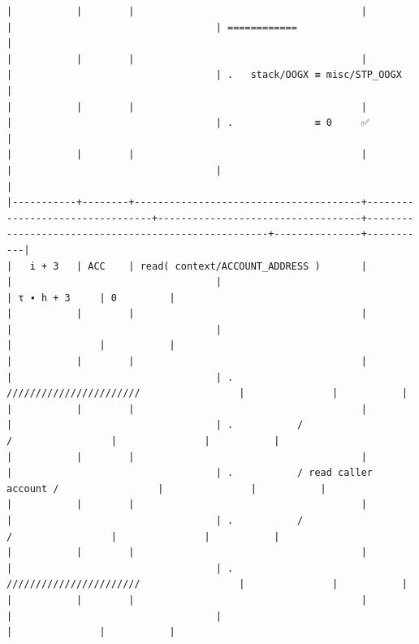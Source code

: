 \documentclass[varwidth=\maxdimen,margin=0.5cm,multi={verbatim}]{standalone}
\begin{document}
\begin{verbatim}
|           |        |                                       |                                 |                                   | ============                                        |
|           |        |                                       |                                 |                                   | .   stack/OOGX ≡ misc/STP_OOGX                      |
|           |        |                                       |                                 |                                   | .              ≡ 0     ✅                           |
|           |        |                                       |                                 |                                   |                                                     |
|-----------+--------+---------------------------------------+---------------------------------+-----------------------------------+-----------------------------------------------------+---------------+-----------|
|   i + 3   | ACC    | read( context/ACCOUNT_ADDRESS )       |                                 |                                   |                                                     | τ ∙ h + 3     | 0         |
|           |        |                                       |                                 |                                   |                                                     |               |           |
|           |        |                                       |                                 |                                   | .           ///////////////////////                 |               |           |
|           |        |                                       |                                 |                                   | .           /                     /                 |               |           |
|           |        |                                       |                                 |                                   | .           / read caller account /                 |               |           |
|           |        |                                       |                                 |                                   | .           /                     /                 |               |           |
|           |        |                                       |                                 |                                   | .           ///////////////////////                 |               |           |
|           |        |                                       |                                 |                                   |                                                     |               |           |

\end{verbatim}
\end{document}
